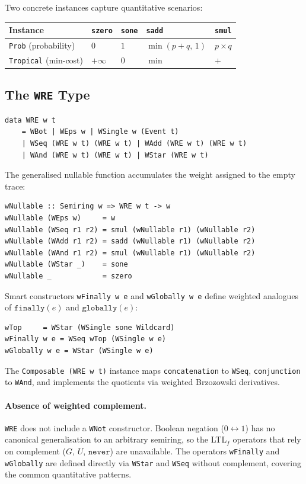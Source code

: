 \documentclass[acmsmall,screen]{acmart}
\newcommand{\finally}[1]{\mathtt{finally}(#1)}
\begin{document}
\noindent
Two concrete instances capture quantitative scenarios:

\begin{center}
\begin{tabular}{lllll}
\toprule
Instance & \lstinline{szero} & \lstinline{sone} & \lstinline{sadd} & \lstinline{smul} \\
\midrule
\lstinline{Prob} (probability) & $0$ & $1$ & $\min(p+q,\,1)$ & $p \times q$ \\
\lstinline{Tropical} (min-cost) & $+\infty$ & $0$ & $\min$ & $+$ \\
\bottomrule
\end{tabular}
\end{center}

\subsection{The \texttt{WRE} Type}

\begin{lstlisting}
data WRE w t
    = WBot | WEps w | WSingle w (Event t)
    | WSeq (WRE w t) (WRE w t) | WAdd (WRE w t) (WRE w t)
    | WAnd (WRE w t) (WRE w t) | WStar (WRE w t)
\end{lstlisting}

\noindent
The generalised nullable function accumulates the weight assigned to the
empty trace:
\begin{lstlisting}
wNullable :: Semiring w => WRE w t -> w
wNullable (WEps w)     = w
wNullable (WSeq r1 r2) = smul (wNullable r1) (wNullable r2)
wNullable (WAdd r1 r2) = sadd (wNullable r1) (wNullable r2)
wNullable (WAnd r1 r2) = smul (wNullable r1) (wNullable r2)
wNullable (WStar _)    = sone
wNullable _            = szero
\end{lstlisting}

Smart constructors \lstinline{wFinally w e} and \lstinline{wGlobally w e}
define weighted analogues of $\finally{e}$ and $\mathtt{globally}(e)$:
\begin{lstlisting}
wTop     = WStar (WSingle sone Wildcard)
wFinally w e = WSeq wTop (WSingle w e)
wGlobally w e = WStar (WSingle w e)
\end{lstlisting}

The \lstinline{Composable (WRE w t)} instance maps \lstinline{concatenation}
to \lstinline{WSeq}, \lstinline{conjunction} to \lstinline{WAnd}, and
implements the quotients via weighted Brzozowski derivatives.

\paragraph{Absence of weighted complement.}
\lstinline{WRE} does not include a \lstinline{WNot} constructor.
Boolean negation ($0 \leftrightarrow 1$) has no canonical generalisation
to an arbitrary semiring, so the LTL$_f$ operators that rely on complement
($G$, $U$, $\mathtt{never}$) are unavailable.
The operators \lstinline{wFinally} and \lstinline{wGlobally} are defined
directly via \lstinline{WStar} and \lstinline{WSeq} without complement,
covering the common quantitative patterns.
\end{document}
